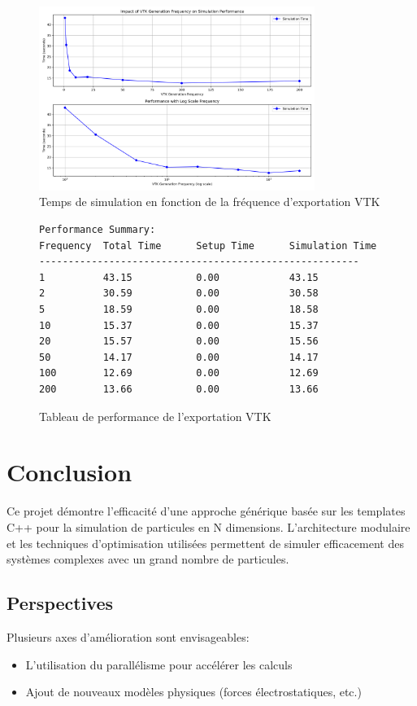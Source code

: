 \documentclass[12pt,a4paper]{article}
\begin{document}
\begin{figure}[H]
\centering
\includegraphics[width=0.8\textwidth]{perf/vtk_frequency_performance.png}
\caption{Temps de simulation en fonction de la fréquence d'exportation VTK}
\end{figure}

\begin{figure}[H]
\centering
\begin{minipage}{\textwidth}
\begin{verbatim}
Performance Summary:
Frequency  Total Time      Setup Time      Simulation Time
-------------------------------------------------------
1          43.15           0.00            43.15          
2          30.59           0.00            30.58          
5          18.59           0.00            18.58          
10         15.37           0.00            15.37          
20         15.57           0.00            15.56          
50         14.17           0.00            14.17          
100        12.69           0.00            12.69          
200        13.66           0.00            13.66    
\end{verbatim}
\end{minipage}
\caption{Tableau de performance de l'exportation VTK}
\end{figure}

\section{Conclusion}

Ce projet démontre l'efficacité d'une approche générique basée sur les templates C++ pour la simulation de particules en N dimensions. L'architecture modulaire et les techniques d'optimisation utilisées permettent de simuler efficacement des systèmes complexes avec un grand nombre de particules.

\subsection{Perspectives}

Plusieurs axes d'amélioration sont envisageables:

\begin{itemize}
    \item L'utilisation du parallélisme pour accélérer les calculs
    \item Ajout de nouveaux modèles physiques (forces électrostatiques, etc.)
\end{itemize}
\end{document}
